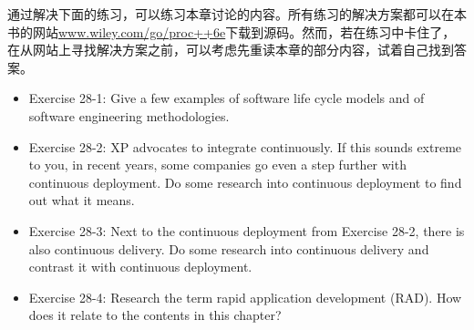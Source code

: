 通过解决下面的练习，可以练习本章讨论的内容。所有练习的解决方案都可以在本书的网站\url{www.wiley.com/go/proc++6e}下载到源码。然而，若在练习中卡住了，在从网站上寻找解决方案之前，可以考虑先重读本章的部分内容，试着自己找到答案。

\begin{itemize}
\item
Exercise 28-1: Give a few examples of software life cycle models and of software engineering methodologies.

\item
Exercise 28-2: XP advocates to integrate continuously. If this sounds extreme to you, in recent years, some companies go even a step further with continuous deployment. Do some research into continuous deployment to find out what it means.

\item
Exercise 28-3: Next to the continuous deployment from Exercise 28-2, there is also continuous delivery. Do some research into continuous delivery and contrast it with continuous deployment.

\item
Exercise 28-4: Research the term rapid application development (RAD). How does it relate to the contents in this chapter?
\end{itemize}










